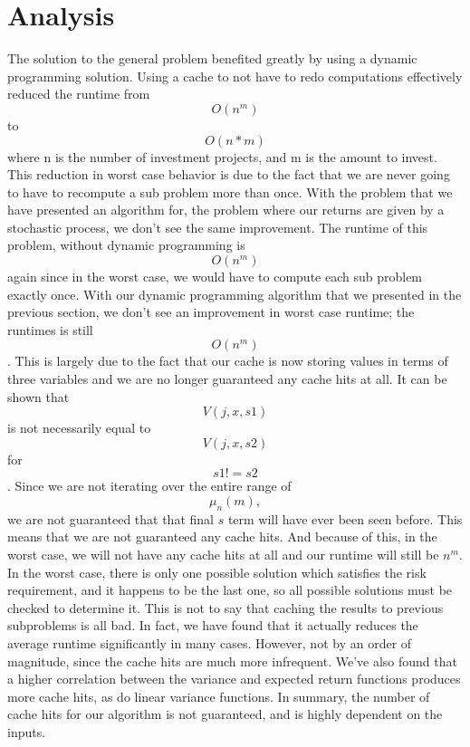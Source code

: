 \documentclass{article}
\begin{document}
\section{Analysis}
The solution to the general problem benefited greatly by using a dynamic programming solution.  Using a cache to not have to redo computations effectively reduced the runtime from $$O(n^{m})$$ to $$O(n*m)$$ where n is the number of investment projects, and m is the amount to invest.  This reduction in worst case behavior is due to the fact that we are never going to have to recompute a sub problem more than once.  
\newline
With the problem that we have presented an algorithm for, the problem where our returns are given by a stochastic process, we don't see the same improvement.  The runtime of this problem, without dynamic programming is $$O(n^{m})$$ again since in the worst case, we would have to compute each sub problem exactly once. With our dynamic programming algorithm that we presented in the previous section, we don't see an improvement in worst case runtime; the runtimes is still $$O(n^{m})$$. This is largely due to the fact that our cache is now storing values in terms of three variables and we are no longer guaranteed any cache hits at all.  
\newline
It can be shown that $$V(j, x, s1)$$ is not necessarily equal to $$V(j, x, s2)$$ for $$s1 != s2$$.
\newline
Since we are not iterating over the entire range of $$\mu_{n}(m),$$ we are not guaranteed that that final $s$ term will have ever been seen before.  This means that we are not guaranteed any cache hits. And because of this, in the worst case, we will not have any cache hits at all and our runtime will still be $n^{m}$. In the worst case, there is only one possible solution which satisfies the risk requirement, and it happens to be the last one, so all possible solutions must be checked to determine it.  
\newline
This is not to say that caching the results to previous subproblems is all bad.  In fact, we have found that it actually reduces the average runtime significantly in many cases. However, not by an order of magnitude, since the cache hits are much more infrequent.  We've also found that a higher correlation between the variance and expected return functions produces more cache hits, as do linear variance functions. In summary, the number of cache hits for our algorithm is not guaranteed, and is highly dependent on the inputs.  
\end{document}

